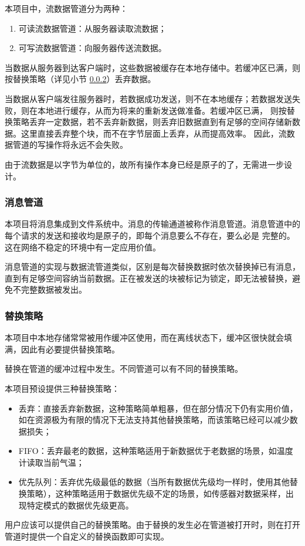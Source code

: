 \documentclass{ctexart}
\begin{document}
本项目中，流数据管道分为两种：
\begin{enumerate}
	\item 可读流数据管道：从服务器读取流数据；
	\item 可写流数据管道：向服务器传送流数据。
\end{enumerate}

当数据从服务器到达客户端时，这些数据被缓存在本地存储中。若缓冲区已满，则按替换策略（详见小节 \ref{design-replace}）丢弃数据。

当数据从客户端发往服务器时，若数据成功发送，则不在本地缓存；若数据发送失败，则在本地进行缓存，从而为将来的重新发送做准备。若缓冲区已满，
则按替换策略丢弃一定数据，若不丢弃新数据，则丢弃旧数据直到有足够的空间存储新数据。这里直接丢弃整个块，而不在字节层面上丢弃，从而提高效率。
因此，流数据管道的写操作将永远不会失败。

由于流数据是以字节为单位的，故所有操作本身已经是原子的了，无需进一步设计。

\subsubsection{消息管道}
\label{design-message}
本项目将消息集成到文件系统中。消息的传输通道被称作消息管道。消息管道中的每个请求的发送和接收均是原子的，即每个消息要么不存在，要么必是
完整的。这在网络不稳定的环境中有一定应用价值。

消息管道的实现与数据流管道类似，区别是每次替换数据时依次替换掉已有消息，直到有足够空间容纳当前数据。正在被发送的块被标记为锁定，即无法被替换，避免不完整数据被发出。

\subsubsection{替换策略}
\label{design-replace}
本项目中本地存储常常被用作缓冲区使用，而在离线状态下，缓冲区很快就会填满，因此有必要提供替换策略。

替换在管道的缓冲过程中发生。不同管道可以有不同的替换策略。

本项目预设提供三种替换策略：
\begin{itemize}
	\item 丢弃：直接丢弃新数据，这种策略简单粗暴，但在部分情况下仍有实用价值，如在资源极为有限的情况下无法支持其他替换策略，而该策略已经可以减少数据损失；
	\item FIFO：丢弃最老的数据，这种策略适用于新数据优于老数据的场景，如温度计读取当前气温；
	\item 优先队列：丢弃优先级最低的数据（当所有数据优先级均一样时，使用其他替换策略），这种策略适用于数据优先级不定的场景，如传感器对数据采样，出现特定模式的数据优先级更高。
\end{itemize}
用户应该可以提供自己的替换策略。由于替换的发生必在管道被打开时，则在打开管道时提供一个自定义的替换函数即可实现。
\end{document}
